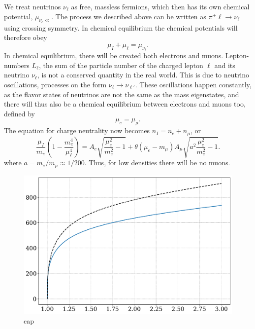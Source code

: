 We treat neutrinos $\nu_\ell$ as free, massless fermions, which then has its own chemical potential, $\mu_{\nu_e\ll}$.
The process we described above can be written as $\pi^+\ell \rightarrow \nu_\ell $ using crossing symmetry.
In chemical equilibrium the chemical potentials will therefore obey
%
\begin{equation}
    \label{chemical equillibrium weak interaction}
    \mu_I + \mu_\ell = \mu_{\nu_\ell}.
\end{equation}
%
In chemical equilibrium, there will be created both electrons and muons.
Lepton-numbers $L_\ell$, the sum of the particle number of the charged lepton $\ell$ and its neutrino $\nu_\ell$, is not a conserved quantity in the real world.
This is due to neutrino oscillations, processes on the form $\nu_\ell \rightarrow \nu_{\ell'}$.
These oscillations happen constantly, as the flavor states of neutrinos are not the same as the mass eigenstates, and there will thus also be a chemical equilibrium between electrons and muons too, defined by
%
\begin{equation}
    \mu_e = \mu_\mu.
\end{equation}
%
The equation for charge neutrality now becomes $n_I = n_e + n_\mu$, or
%
\begin{equation}
    \frac{\mu_I}{m_\pi} \left(1 - \frac{m_\pi^4}{\mu_I^4}\right)
    =
    A_e \sqrt{\frac{\mu_e^2}{m_e^2} - 1}
    +
    \theta(\mu_e - m_\mu) 
    A_\mu \sqrt{a^2 \frac{\mu_e^2}{m_e^2} - 1}.
\end{equation}
%
where $a = m_e/m_\mu \approx 1 / 200$.
Thus, for low densities there will be no muons.

\begin{figure}[!htb]
    \centering
    \includegraphics[width=\textwidth]{../scripts/figurer/neutrino_mu.pdf}
    \caption{
        cap
    }
    \label{fig: neutrino mu}
\end{figure}



